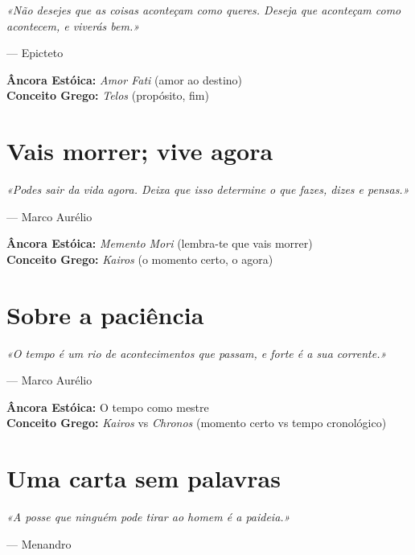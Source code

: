 \documentclass[
  11pt,
  a5paper,
]{book}
\begin{document}
\emph{«Não desejes que as coisas aconteçam como queres. Deseja que
aconteçam como acontecem, e viverás bem.»}

--- Epicteto

\textbf{Âncora Estóica:} \emph{Amor Fati} (amor ao destino)\\
\textbf{Conceito Grego:} \emph{Telos} (propósito, fim)

\chapter{Vais morrer; vive agora}\label{vais-morrer-vive-agora}

\emph{«Podes sair da vida agora. Deixa que isso determine o que fazes,
dizes e pensas.»}

--- Marco Aurélio

\textbf{Âncora Estóica:} \emph{Memento Mori} (lembra-te que vais
morrer)\\
\textbf{Conceito Grego:} \emph{Kairos} (o momento certo, o agora)

\chapter{Sobre a paciência}\label{sobre-a-paciuxeancia}

\emph{«O tempo é um rio de acontecimentos que passam, e forte é a sua
corrente.»}

--- Marco Aurélio

\textbf{Âncora Estóica:} O tempo como mestre\\
\textbf{Conceito Grego:} \emph{Kairos} vs \emph{Chronos} (momento certo
vs tempo cronológico)

\chapter{Uma carta sem palavras}\label{uma-carta-sem-palavras}

\emph{«A posse que ninguém pode tirar ao homem é a paideia.»}

--- Menandro


\backmatter
\end{document}
